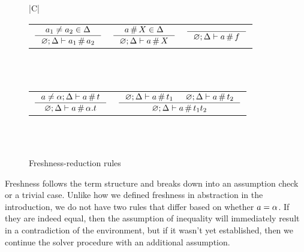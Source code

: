 \documentclass[english, mgr]{iithesis}
\newcommand{\solverRule}{\vdash}
\begin{document}
\begin{figure}[htbp]
    \centering
    \begin{tabularx}{\textwidth}{|C|}
      \hline \\
      \begin{tabular}{ccc}
      $
      \inference{
        \atomv_1 \cneq \atomv_2 \in \icEnv
      }{
        \emptyenv ; \icEnv \solverRule \atomv_1 \cfresh \atomv_2
      }
      $ & $
      \inference{
        \atomv \cfresh \termv \in \icEnv
      }{
        \emptyenv ; \icEnv \solverRule \atomv \cfresh \termv
      }
      $ & $
      \inference{
      }{
        \emptyenv ; \icEnv \solverRule \atomv \cfresh \symb
      }
      $
      \end{tabular}
      \\ \\
      \begin{tabular}{cc}
      $
      \inference{
        \atomv \cneq \atomexp ; \icEnv \solverRule \atomv \cfresh \term
      }{
        \emptyenv ; \icEnv \solverRule \atomv \cfresh \tbind{\atomexp}{\term}
      }
      $ &
      $
      \inference{
        \emptyenv ; \icEnv \solverRule \atomv \cfresh \term_1
        &
        \emptyenv ; \icEnv \solverRule \atomv \cfresh \term_2
      }{
        \emptyenv ; \icEnv \solverRule \atomv \cfresh \term_1 \term_2
      }
      $
      \end{tabular}
      \\ \\ \hline
      \end{tabularx}
  \caption{Freshness-reduction rules}
  \label{fig:freshness-rules}
\end{figure}
Freshness follows the term structure and breaks down into an assumption check or a trivial case.
Unlike how we defined freshness in abstraction in the introduction,
we do not have two rules that differ based on whether $a = \alpha$.
If they are indeed equal, then the assumption of inequality will immediately
result in a contradiction of the environment, but if it wasn't yet established,
then we continue the solver procedure with an additional assumption.
\end{document}
